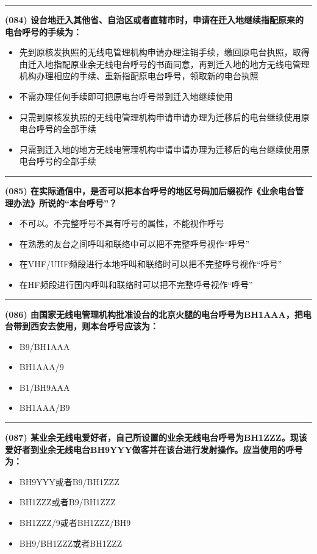 \documentclass[twocolumn]{ctexart}  %
\begin{document}
\noindent\rule{0.5\textwidth}{1pt}
\heiti \textbf{(084) 设台地迁入其他省、自治区或者直辖市时，申请在迁入地继续指配原来的电台呼号的手续为：} \songti {\color{gray} [LK0092] }
\begin{itemize}
	\item  先到原核发执照的无线电管理机构申请办理注销手续，缴回原电台执照，取得由迁入地指配原业余无线电台呼号的书面同意，再到迁入地的地方无线电管理机构办理相应的手续、重新指配原电台呼号，领取新的电台执照
	\item  不需办理任何手续即可把原电台呼号带到迁入地继续使用
	\item  只需到原核发执照的无线电管理机构申请申请办理为迁移后的电台继续使用原电台呼号的全部手续
	\item  只需到迁入地的地方无线电管理机构申请申请办理为迁移后的电台继续使用原电台呼号的全部手续
\end{itemize}


\noindent\rule{0.5\textwidth}{1pt}
\heiti \textbf{(085) 在实际通信中，是否可以把本台呼号的地区号码加后缀视作《业余电台管理办法》所说的“本台呼号”？} \songti {\color{gray} [LK1072] }
\begin{itemize}
	\item  不可以。不完整呼号不具有呼号的属性，不能视作呼号
	\item  在熟悉的友台之间呼叫和联络中可以把不完整呼号视作“呼号”
	\item  在VHF/UHF频段进行本地呼叫和联络时可以把不完整呼号视作“呼号”
	\item  在HF频段进行国内呼叫和联络时可以把不完整呼号视作“呼号”
\end{itemize}


\noindent\rule{0.5\textwidth}{1pt}
\heiti \textbf{(086) 由国家无线电管理机构批准设台的北京火腿的电台呼号为BH1AAA，把电台带到西安去使用，则本台呼号应该为：} \songti {\color{gray} [LK0079] }
\begin{itemize}
	\item  B9/BH1AAA
	\item  BH1AAA/9
	\item  B1/BH9AAA
	\item  BH1AAA/B9
\end{itemize}


\noindent\rule{0.5\textwidth}{1pt}
\heiti \textbf{(087) 某业余无线电爱好者，自己所设置的业余无线电台呼号为BH1ZZZ。现该爱好者到业余无线电台BH9YYY做客并在该台进行发射操作。应当使用的呼号为：} \songti {\color{gray} [LK0084] }
\begin{itemize}
	\item  BH9YYY或者B9/BH1ZZZ
	\item  BH1ZZZ或者B9/BH1ZZZ
	\item  BH1ZZZ/9或者BH1ZZZ/BH9
	\item  BH9/BH1ZZZ或者BH1ZZZ
\end{itemize}
\end{document}
